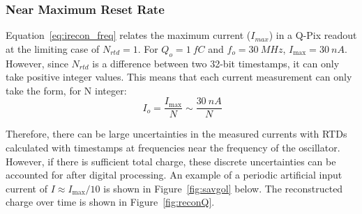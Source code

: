 \subsubsection{Near Maximum Reset Rate}

Equation~\ref{eq:irecon_freq} relates the maximum current ($I_{max}$) in a Q-Pix readout at the limiting case of $N_{rtd} = 1$.
For $Q_{o} = 1~\unit{fC}$ and $f_{o} = 30~\unit{MHz}$, $I_{\mathrm{max}} = 30~\unit{nA}$.
However, since $N_{rtd}$ is a difference between two 32-bit timestamps, it can only take positive integer values.
This means that each current measurement can only take the form, for N integer: 
\begin{equation}~\label{eq:i_max}
I_{o} = \frac{I_{\mathrm{max}}}{N} \sim \frac{30~\unit{nA}}{N}
\end{equation}

Therefore, there can be large uncertainties in the measured currents with RTDs calculated with timestamps at frequencies near the frequency of the oscillator.
However, if there is sufficient total charge, these discrete uncertainties can be accounted for after digital processing.
An example of a periodic artificial input current of $I \approx I_{\mathrm{max}}/10$ is shown in Figure~\ref{fig:savgol} below.
The reconstructed charge over time is shown in Figure~\ref{fig:reconQ}.

